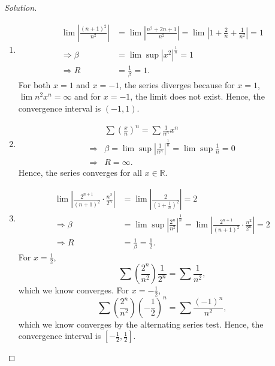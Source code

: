 \documentclass{article}
\renewcommand*{\implies}{\ensuremath{\Longrightarrow}}
\newcommand*{\R}{\ensuremath{\mathbb{R}}}
\begin{document}
\begin{proof}[Solution]\indent
    \begin{enumerate}[label=\textbf{(\alph*)}]
        \item \begin{align*}
            \lim \left|\frac{(n+1)^2}{n^2}\right| & = \lim \left|\frac{n^2+2n+1}{n^2}\right|
            = \lim \left|1+\frac{2}{n}+\frac{1}{n^2}\right| = 1 \\
            \implies \beta & = \lim \sup |x^2|^{\frac{1}{n}} = 1 \\
            \implies R & = \frac{1}{\beta} = 1.
        \end{align*}
        For both $x=1$ and $x=-1$, the series diverges because for $x=1$, $\lim n^2 x^n = \infty$
        and for $x=-1$, the limit does not exist. Hence, the convergence interval is $(-1, 1)$.

        \item 
        \begin{align*}
            & \sum \left(\frac{x}{n}\right)^n = \sum \frac{1}{n^n}x^n \\
            \implies & \beta = \lim \sup \left|\frac{1}{n^n}\right|^{\frac{1}{n}} = 
            \lim \sup \frac{1}{n} = 0 \\
            \implies & R = \infty.
        \end{align*}
        Hence, the series converges for all $x\in\R$.

        \item \begin{align*}
            \lim \left|\frac{2^{n+1}}{(n+1)^2}\cdot\frac{n^2}{2^n}\right| & = 
            \lim \left|\frac{2}{\left(1+\frac{1}{n}\right)^2}\right| = 2 \\
            \implies \beta & = \lim \sup \left|\frac{2^n}{n^2}\right|^{\frac{1}{n}} = 
            \lim \left|\frac{2^{n+1}}{(n+1)^2}\cdot\frac{n^2}{2^n}\right| = 2 \\
            \implies R & = \frac{1}{\beta} = \frac{1}{2}.
        \end{align*}
        For $x=\frac{1}{2}$, 
        $$\sum\left(\frac{2^n}{n^2}\right)\frac{1}{2^n} = \sum\frac{1}{n^2},$$
        which we know converges. For $x=-\frac{1}{2}$,
        $$\sum\left(\frac{2^n}{n^2}\right)\left(-\frac{1}{2}\right)^n = \sum\frac{(-1)^n}{n^2},$$
        which we know converges by the alternating series test. Hence, the convergence interval is
        $\left[-\frac{1}{2}, \frac{1}{2}\right]$.
    \end{enumerate}
\end{proof}
\end{document}
